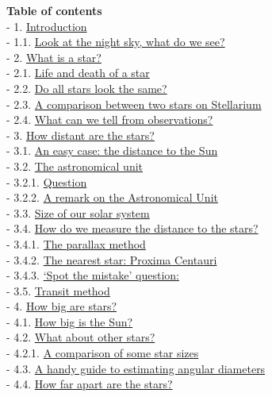 \documentclass[
  letterpaper,
  DIV=11,
  numbers=noendperiod]{scrreprt}
\begin{document}
\textbf{Table of contents}\\
- 1. \protect\hyperlink{toc1_}{Introduction}\\
- 1.1. \protect\hyperlink{toc1_1_}{Look at the night sky, what do we
see?}\\
- 2. \protect\hyperlink{toc2_}{What is a star?}\\
- 2.1. \protect\hyperlink{toc2_1_}{Life and death of a star}\\
- 2.2. \protect\hyperlink{toc2_2_}{Do all stars look the same?}\\
- 2.3. \protect\hyperlink{toc2_3_}{A comparison between two stars on
Stellarium}\\
- 2.4. \protect\hyperlink{toc2_4_}{What can we tell from
observations?}\\
- 3. \protect\hyperlink{toc3_}{How distant are the stars?}\\
- 3.1. \protect\hyperlink{toc3_1_}{An easy case: the distance to the
Sun}\\
- 3.2. \protect\hyperlink{toc3_2_}{The astronomical unit}\\
- 3.2.1. \protect\hyperlink{toc3_2_1_}{Question}\\
- 3.2.2. \protect\hyperlink{toc3_2_2_}{A remark on the Astronomical
Unit}\\
- 3.3. \protect\hyperlink{toc3_3_}{Size of our solar system}\\
- 3.4. \protect\hyperlink{toc3_4_}{How do we measure the distance to the
stars?}\\
- 3.4.1. \protect\hyperlink{toc3_4_1_}{The parallax method}\\
- 3.4.2. \protect\hyperlink{toc3_4_2_}{The nearest star: Proxima
Centauri}\\
- 3.4.3. \protect\hyperlink{toc3_4_3_}{`Spot the mistake' question:}\\
- 3.5. \protect\hyperlink{toc3_5_}{Transit method}\\
- 4. \protect\hyperlink{toc4_}{How big are stars?}\\
- 4.1. \protect\hyperlink{toc4_1_}{How big is the Sun?}\\
- 4.2. \protect\hyperlink{toc4_2_}{What about other stars?}\\
- 4.2.1. \protect\hyperlink{toc4_2_1_}{A comparison of some star
sizes}\\
- 4.3. \protect\hyperlink{toc4_3_}{A handy guide to estimating angular
diameters}\\
- 4.4. \protect\hyperlink{toc4_4_}{How far apart are the stars?}\\
\end{document}
